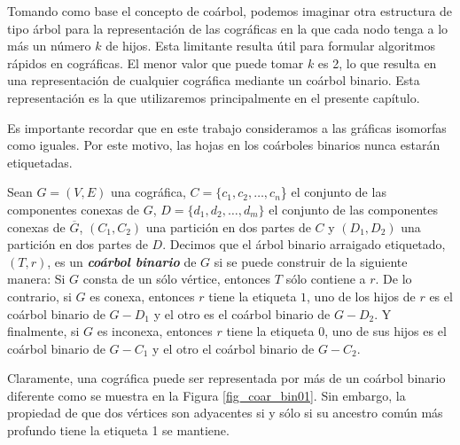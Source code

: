 Tomando como base el concepto de coárbol, podemos imaginar otra estructura de
tipo árbol para la representación de las cográficas en la que cada nodo tenga a
lo más un número $k$ de hijos. Esta limitante resulta útil para formular
algoritmos rápidos en cográficas. El menor valor que puede tomar $k$ es 2,
lo que resulta en una representaci\'on de cualquier cogr\'afica
mediante un co\'arbol binario.   Esta representaci\'on es la
que utilizaremos principalmente en el presente cap\'itulo.

Es importante recordar que en este trabajo consideramos a las gr\'aficas
isomorfas como iguales.  Por este motivo, las hojas en los co\'arboles
binarios nunca estar\'an etiquetadas.

Sean $G=(V,E)$ una cográfica, $C = \{c_1, c_2, \dots, c_n$\} el conjunto de
las componentes conexas de $G$, $D = \{d_1, d_2, \dots, d_m\}$ el conjunto
de las componentes conexas de $\overline{G}$, $(C_1, C_2)$ una partición en
dos partes de $C$ y $(D_1, D_2)$ una partición en dos partes de $D$. Decimos
que el árbol binario arraigado etiquetado, $(T,r)$, es un
\textbf{\emph{coárbol binario}} de $G$ si se puede construir de la siguiente
manera: Si $G$ consta de un sólo vértice, entonces $T$ sólo contiene a $r$.
De lo contrario, si $G$ es conexa, entonces $r$ tiene la etiqueta $1$, uno
de los hijos de $r$ es el coárbol binario de $G-D_1$ y el otro es el coárbol
binario de $G-D_2$. Y finalmente, si $G$ es inconexa, entonces $r$ tiene la
etiqueta $0$, uno de sus hijos es el coárbol binario de $G-C_1$ y el otro el
coárbol binario de $G-C_2$.

Claramente, una cográfica puede ser representada por más de un coárbol binario
diferente como se muestra en la Figura \ref{fig_coar_bin01}. Sin embargo, la
propiedad de que dos vértices son adyacentes si y sólo si su ancestro común más
profundo tiene la etiqueta 1 se mantiene.


